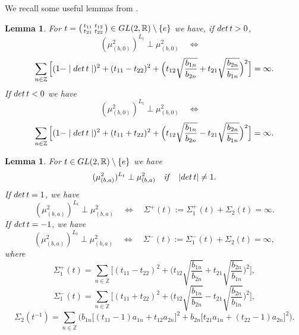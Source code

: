 \documentclass[preprint,12pt]{elsarticle}
\newtheorem{lem}[thm]{Lemma}
\numberwithin{equation}{section}
\begin{document}
We recall some useful lemmas from \cite{KosJFA17}.
%
\begin{lem}
\label{l7.5}
 For $t=\left(\begin{smallmatrix}
t_{11}& t_{12}\\
t_{21}& t_{22}
  \end{smallmatrix}
  \right)
 \in {\rm GL}(2,{\mathbb R})\setminus\{e\}$ we have, if ${\rm det}\,t>0$,
$$
(\mu_{(b,0)}^2)^{L_t}\perp\mu_{(b,0)}^2\quad\Leftrightarrow\quad
$$
\begin{equation}
\sum_{n\in{\mathbb Z}}\Big[ (1-\mid{\rm
det}\,t\mid)^2+(t_{11}-t_{22})^2+\Big(t_{12}\sqrt{\frac{b_{1n}}{b_{2n}}}+
t_{21}\sqrt{\frac{b_{2n}}{b_{1n}}}\Big)^2\Big]=\infty.
\end{equation}
If ${\rm det}\,t<0$ we have
$$
(\mu_{(b,0)}^2)^{L_t}\perp\mu_{(b,0)}^2\quad\Leftrightarrow\quad
$$
\begin{equation}
\sum_{n\in{\mathbb Z}} \Big[ (1-\mid{\rm det}\,t\mid)^2 +
(t_{11}+t_{22})^2+\Big(t_{12}\sqrt{\frac{b_{1n}}{b_{2n}}}-
t_{21}\sqrt{\frac{b_{2n}}{b_{1n}}}\Big)^2\Big]=\infty.
\end{equation}
\end{lem}
%
\begin{lem}
\label{l7.6}
 For $t\in {\rm GL}(2,{\mathbb R})\setminus\{e\}$ we have
\begin{equation*}
 (\mu_{(b,a)}^2)^{L_t}\perp\mu_{(b,a)}^2\quad{\it
if}\quad\vert {\rm det}\,t\vert\not=1.
\end{equation*}
If ${\rm det}\,t=1$, we have
$$
(\mu_{(b,a)}^2)^{L_t}\perp\mu_{(b,a)}^2\quad\Leftrightarrow\quad\Sigma^+(t):=\Sigma_1^+(t)+
\Sigma_2(t)=\infty.
$$
If ${\rm det}\,t=-1$, we have
$$
(\mu_{(b,a)}^2)^{L_t}\perp\mu_{(b,a)}^2\quad\Leftrightarrow\quad\Sigma^{-}(t):=\Sigma_1^{-}(t)+
\Sigma_2(t)=\infty,
$$
where
$$
\Sigma_1^+(t)=\sum_{n\in{\mathbb
Z}}\Big[(t_{11}-t_{22})^2+\Big(t_{12}\sqrt{\frac{b_{1n}}{b_{2n}}}+
t_{21}\sqrt{\frac{b_{2n}}{b_{1n}}}\Big)^2\Big],
$$
$$
\Sigma_1^{-}(t)=\sum_{n\in{\mathbb
Z}}\Big[(t_{11}+t_{22})^2+\Big(t_{12}\sqrt{\frac{b_{1n}}{b_{2n}}}-
t_{21}\sqrt{\frac{b_{2n}}{b_{1n}}}\Big)^2\Big],
$$
\begin{equation}
\label{Sigma_2}
\Sigma_2(t^{-1})=\sum_{n\in{\mathbb
Z}}\Big(b_{1n}\big[(t_{11}-1)a_{1n}+t_{12}a_{2n}\big]^2+b_{2n}\big[t_{21}a_{1n}+(t_{22}-1)a_{2n}\big]^2\Big).
\end{equation}
\end{lem}
%
\end{document}
